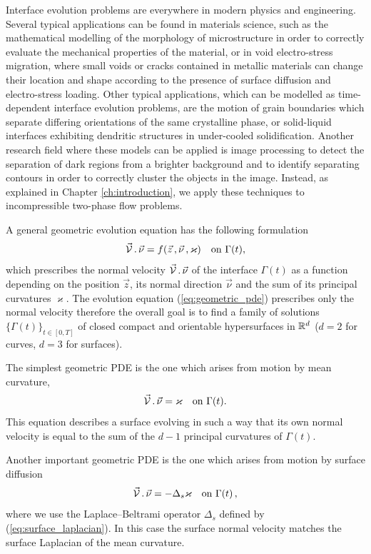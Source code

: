 Interface evolution problems are everywhere in modern physics and engineering.
Several typical applications can be found in materials science, such as the
mathematical modelling of the morphology of microstructure in order to
correctly evaluate the mechanical properties of the material, or in void
electro-stress migration, where small voids or cracks contained in metallic
materials can change their location and shape according to the presence of
surface diffusion and electro-stress loading. Other typical applications, which
can be modelled as time-dependent interface evolution problems, are the motion
of grain boundaries which separate differing orientations of the same
crystalline phase, or solid-liquid interfaces exhibiting dendritic structures in
under-cooled solidification. Another research field where these models can be
applied is image processing to detect the separation of dark regions from a
brighter background and to identify separating contours in order to correctly
cluster the objects in the image. Instead, as explained in Chapter
\ref{ch:introduction}, we apply these techniques to incompressible two-phase
flow problems.

A general geometric evolution equation has the following formulation
\begin{equation}\label{eq:geometric_pde}
\vec{\mathcal{V}}\,.\,\vec\nu=f(\vec{z}\,,\vec{\nu}\,,\varkappa)
\quad\mbox{on }\Gamma(t),
\end{equation}
which prescribes the normal velocity $\vec{\mathcal{V}}\,.\,\vec\nu$ of the
interface $\Gamma(t)$ as a function depending on the position $\vec z$, its
normal direction $\vec{\nu}$ and the sum of its principal curvatures
$\varkappa$. The evolution equation (\ref{eq:geometric_pde}) prescribes only
the normal velocity therefore the overall goal is to find a family of
solutions $\{ \Gamma(t) \}_{t \in [0, T]}$ of closed compact and orientable
hypersurfaces in ${\mathbb R}^{d}$ ($d = 2$ for curves, $d = 3$ for surfaces).

The simplest geometric PDE is the one which arises from motion by mean
curvature,
\begin{equation}\label{eq:mean_curvature}
\vec{\mathcal{V}}\,.\,\vec\nu=\varkappa\quad\mbox{on }\Gamma(t).
\end{equation}
This equation describes a surface evolving in such a way that its own normal
velocity is equal to the sum of the $d-1$ principal curvatures of $\Gamma(t)$.

Another important geometric PDE is the one which arises from motion by
surface diffusion
\begin{equation}\label{eq:surface_diff}
\vec{\mathcal{V}}\,.\,\vec\nu=-\Delta_s \varkappa \quad\mbox{on }\Gamma(t)\,,
\end{equation}
where we use the Laplace--Beltrami operator $\Delta_s$ defined by
(\ref{eq:surface_laplacian}). In this case the surface normal velocity matches
the surface Laplacian of the mean curvature.

